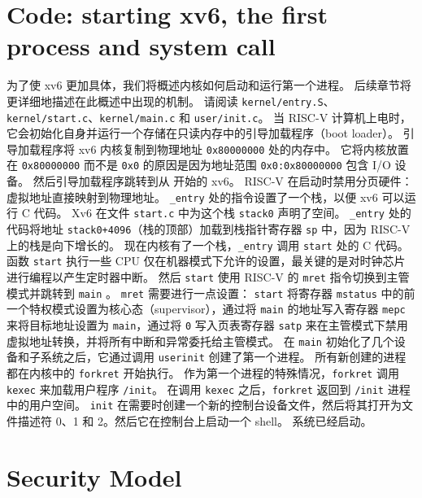 \section{Code: starting xv6, the first process and system call}
为了使 xv6 更加具体，我们将概述内核如何启动和运行第一个进程。
后续章节将更详细地描述在此概述中出现的机制。
请阅读 {\tt kernel/entry.S}、{\tt kernel/start.c}、{\tt kernel/main.c} 和 {\tt user/init.c}。
当 RISC-V 计算机上电时，它会初始化自身并运行一个存储在只读内存中的引导加载程序（boot loader）。
引导加载程序将 xv6 内核复制到物理地址 \texttt{0x80000000} 处的内存中。
它将内核放置在 \texttt{0x80000000} 而不是 \texttt{0x0} 的原因是因为地址范围 \texttt{0x0:0x80000000} 包含 I/O 设备。
然后引导加载程序跳转到从   开始的 xv6。
RISC-V 在启动时禁用分页硬件：虚拟地址直接映射到物理地址。
\lstinline{_entry} 处的指令设置了一个栈，以便 xv6 可以运行 C 代码。
Xv6 在文件 \lstinline{start.c}  中为这个栈 \lstinline{stack0} 声明了空间。
\lstinline{_entry} 处的代码将地址 \lstinline{stack0+4096}（栈的顶部）加载到栈指针寄存器 \texttt{sp} 中，因为 RISC-V 上的栈是向下增长的。
现在内核有了一个栈，\lstinline{_entry} 调用 \lstinline{start}  处的 C 代码。
函数 \lstinline{start} 执行一些 CPU 仅在机器模式下允许的设置，最关键的是对时钟芯片进行编程以产生定时器中断。
然后 {\tt start} 使用 RISC-V 的 {\tt mret} 指令切换到主管模式并跳转到 \lstinline{main} 。
{\tt mret} 需要进行一点设置：
{\tt start} 将寄存器 \lstinline{mstatus} 中的前一个特权模式设置为核心态（supervisor），通过将 \lstinline{main} 的地址写入寄存器 \lstinline{mepc} 来将目标地址设置为 \lstinline{main}，通过将 \lstinline{0} 写入页表寄存器 \lstinline{satp} 来在主管模式下禁用虚拟地址转换，并将所有中断和异常委托给主管模式。
在 \lstinline{main}  初始化了几个设备和子系统之后，它通过调用 \lstinline{userinit}  创建了第一个进程。
所有新创建的进程都在内核中的 \lstinline{forkret}  开始执行。
作为第一个进程的特殊情况，{\tt forkret} 调用 {\tt kexec} 来加载用户程序 {\tt /init}。
在调用 \lstinline{kexec} 之后，{\tt forkret} 返回到 {\tt /init} 进程中的用户空间。
\lstinline{init}  在需要时创建一个新的控制台设备文件，然后将其打开为文件描述符 0、1 和 2。然后它在控制台上启动一个 shell。
系统已经启动。

\section{Security Model}

